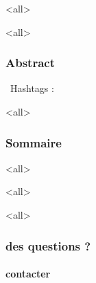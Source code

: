 \documentclass[ignorenonframetext,allowframebreaks,aspectratio=169,t,8pt, xcolor=table]{beamer}
\title[\ushorttitle]{\utitle}
\subtitle{\tiny\uCourseLongName}
\author[\uauthorwriter]{ \LARGE{\uauthor} \\ \medskip {\small \url{\umaila} \and \url{\umailb}\\ {\small \url{\usitea}}}}
\institute[\uinstituteshort]{{\uinstitute \\ \uchaire}}
\date[\uversion]{\tiny{Publication \INFODistrib ~du \\ \DTMnow}}
\begin{document}
\mode<all>{}
\begin{frame}[plain]
                 \titlepage
\end{frame}

\mode<all>{}
\begin{frame}
	\frametitle{Abstract}
	\begin{techworkin} [righthand width=.6\textwidth]{\faCogs~\small {Hashtags} : \ukeywords}\uabstract
	\end{techworkin}
	\end{frame}
   

\mode<all>{}
\begin{frame}
\frametitle{Sommaire}
\begin{multicols}{2}
\tableofcontents[hideallsubsections]
\end{multicols}
\end{frame}

\mode<all>{}

\mode<all>{\ubody}


\mode<all>{}
\begin{frame}
\frametitle{des questions ?}
\framesubtitle{contacter \umaila}

\end{frame}
\end{document}
